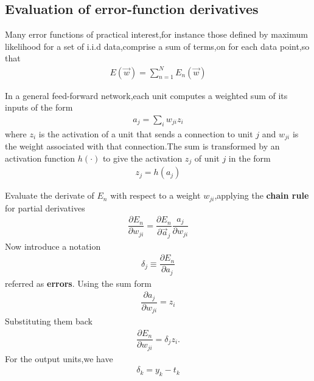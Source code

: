 \subsection{Evaluation of error-function derivatives}
Many error functions of practical interest,for instance those defined by maximum likelihood for a set of i.i.d data,comprise a sum of terms,on for each data point,so that
\begin{align}
    E(\vec{w})=\sum_{n=1}^{N}E_n(\vec{w})
\end{align}

In a general feed-forward network,each unit computes a weighted sum of its inputs of the form
\begin{align}
    a_j=\sum_i w_{ji} z_i
\end{align}
where $z_i$ is the activation of a unit that sends a connection to unit $j$ and $w_{ji}$ is the weight associated with that connection.The sum is transformed by an activation function $h(\cdot)$ to give the activation $z_j$ of unit $j$ in the form
\begin{align}
    z_j=h(a_j)
\end{align}

Evaluate the derivate of $E_n$ with respect to a weight $w_{ji}$,applying the \textbf{chain rule} for partial derivatives
\begin{align}
    \dfrac{\partial E_n}{\partial w_{ji}}=\dfrac{\partial E_n}{\partial \vec{a}_j}\dfrac{a_j}{\partial w_{ji}}
\end{align}
Now introduce a notation
\begin{align}
    \delta_j \equiv \dfrac{\partial E_n}{\partial a_j}
\end{align}
referred as \textbf{errors}.
Using the sum form
\begin{align}
    \dfrac{\partial a_j}{\partial w_{ji}} = z_i
\end{align}
Substituting them back
\begin{align}
    \dfrac{\partial E_n}{\partial w_{ji}}=\delta_j z_i.
\end{align}
For the output units,we have
\begin{align}
    \delta_k=y_k-t_k
\end{align}

